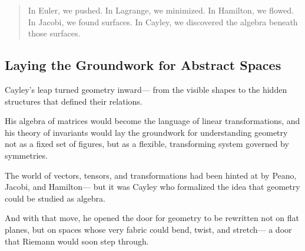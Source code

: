 \bigskip

\begin{quote}
In Euler, we pushed.  
In Lagrange, we minimized.  
In Hamilton, we flowed.  
In Jacobi, we found surfaces.  
In Cayley, we discovered the algebra beneath those surfaces.
\end{quote}

\subsection*{Laying the Groundwork for Abstract Spaces}

Cayley’s leap turned geometry inward—  
from the visible shapes to the hidden structures that defined their relations.

His algebra of matrices would become the language of linear transformations,  
and his theory of invariants would lay the groundwork for understanding geometry not as a fixed set of figures,  
but as a flexible, transforming system governed by symmetries.

The world of vectors, tensors, and transformations had been hinted at by Peano, Jacobi, and Hamilton—  
but it was Cayley who formalized the idea that geometry could be studied as algebra.

And with that move, he opened the door for geometry to be rewritten not on flat planes,  
but on spaces whose very fabric could bend, twist, and stretch—  
a door that Riemann would soon step through.

